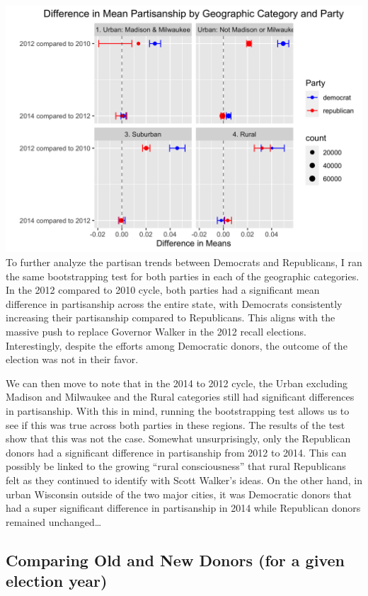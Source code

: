 \documentclass[10pt,]{article}
\begin{document}
\includegraphics{geo_and_parties.png} To further analyze the partisan
trends between Democrats and Republicans, I ran the same bootstrapping
test for both parties in each of the geographic categories. In the 2012
compared to 2010 cycle, both parties had a significant mean difference
in partisanship across the entire state, with Democrats consistently
increasing their partisanship compared to Republicans. This aligns with
the massive push to replace Governor Walker in the 2012 recall
elections. Interestingly, despite the efforts among Democratic donors,
the outcome of the election was not in their favor.

We can then move to note that in the 2014 to 2012 cycle, the Urban
excluding Madison and Milwaukee and the Rural categories still had
significant differences in partisanship. With this in mind, running the
bootstrapping test allows us to see if this was true across both parties
in these regions. The results of the test show that this was not the
case. Somewhat unsurprisingly, only the Republican donors had a
significant difference in partisanship from 2012 to 2014. This can
possibly be linked to the growing ``rural consciousness'' that rural
Republicans felt as they continued to identify with Scott Walker's
ideas. On the other hand, in urban Wisconsin outside of the two major
cities, it was Democratic donors that had a super significant difference
in partisanship in 2014 while Republican donors remained
unchanged\ldots{}

\hypertarget{comparing-old-and-new-donors-for-a-given-election-year}{%
\subsection{Comparing Old and New Donors (for a given election
year)}\label{comparing-old-and-new-donors-for-a-given-election-year}}
\end{document}
